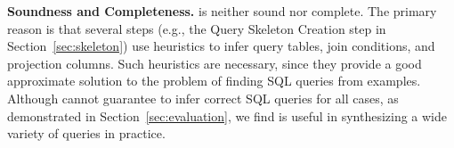 \vspace{-1mm}


\noindent \textbf{Soundness and Completeness.} \ourtool
is neither sound nor complete. The primary
reason is that several steps (e.g., the Query Skeleton Creation
step in Section~\ref{sec:skeleton}) use heuristics
to infer query tables, join conditions, and projection columns.
Such heuristics are necessary, since they provide a
good approximate solution to the problem of finding SQL queries
from examples. %
Although \ourtool cannot guarantee to infer correct SQL queries
for all cases, as demonstrated in Section~\ref{sec:evaluation},
we find \ourtool
is useful in synthesizing a wide variety of queries in practice.

